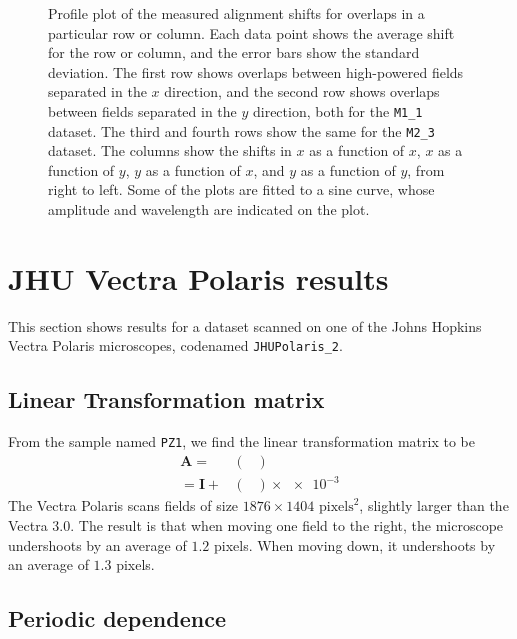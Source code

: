 \documentclass{article}
\newcommand{\matrixbold}[1]{\mathbf{#1}}
\newcommand{\M}[2]{\texttt{M#1\_#2}}
\begin{document}
\begin{figure}[ht]
\begin{subfigure}{0.24\linewidth}
		\caption{}
		\label{fig:sinewave4yy2}
	\end{subfigure}
	\caption{Profile plot of the measured alignment shifts for overlaps in a particular row or column.  Each data point shows the average shift for the row or column, and the error bars show the standard deviation.  The first row shows overlaps between high-powered fields separated in the $x$ direction, and the second row shows overlaps between fields separated in the $y$ direction, both for the \M11 dataset.  The third and fourth rows show the same for the \M23 dataset.  The columns show the shifts in $x$ as a function of $x$, $x$ as a function of $y$, $y$ as a function of $x$, and $y$ as a function of $y$, from right to left.  Some of the plots are fitted to a sine curve, whose amplitude and wavelength are indicated on the plot.}
	\label{fig:sinewaves}
\end{figure}

\clearpage

\iffalse
\section{JHU Vectra Polaris results}

This section shows results for a dataset scanned on one of the Johns Hopkins Vectra Polaris microscopes, codenamed \texttt{JHUPolaris\_2}.

\subsection{Linear Transformation matrix}

From the sample named \texttt{PZ1}, we find the linear transformation matrix to be
\begin{align}
\matrixbold{A}=&\begin{pmatrix}
\end{pmatrix} \\
=\matrixbold{I} + &\begin{pmatrix}
\end{pmatrix} \times \num{e-3}
\label{eq:Amatrix_PZ1}
\end{align}
The Vectra Polaris scans fields of size $1876\times1404$ $\text{pixels}^2$, slightly larger than the Vectra 3.0.  The result is that when moving one field to the right, the microscope undershoots by an average of $1.2$ pixels.  When moving down, it undershoots by an average of $1.3$ pixels.

\subsection{Periodic dependence}
\label{sec:JHUpolarisperiodic}
\end{document}
